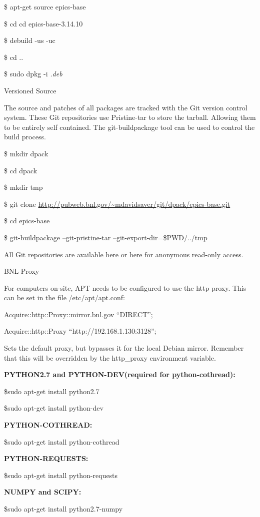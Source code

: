 \documentclass[letterpaper,10pt,english]{sphinxmanual}
\begin{document}
\$ apt-get source epics-base

\$ cd cd epics-base-3.14.10

\$ debuild -us -uc

\$ cd ..

\$ sudo dpkg -i \emph{.deb}

Versioned Source

The source and patches of all packages are tracked with the Git version control system. These Git repositories use Pristine-tar to store the tarball. Allowing them to be entirely self contained. The git-buildpackage tool can be used to control the build process.

\$ mkdir dpack

\$ cd dpack

\$ mkdir tmp

\$ git clone \href{http://pubweb.bnl.gov/~mdavidsaver/git/dpack/epics-base.git}{http://pubweb.bnl.gov/\textasciitilde{}mdavidsaver/git/dpack/epics-base.git}

\$ cd epics-base

\$ git-buildpackage --git-pristine-tar --git-export-dir=\$PWD/../tmp

All Git repositories are available here or here for anonymous read-only access.

BNL Proxy

For computers on-site, APT needs to be configured to use the http proxy. This can be set in the file /etc/apt/apt.conf:

Acquire::http::Proxy::mirror.bnl.gov ``DIRECT'';

Acquire::http::Proxy  ``http://192.168.1.130:3128'';

Sets the default proxy, but bypasses it for the local Debian mirror. Remember that this will be overridden by the http\_proxy environment variable.

\textbf{PYTHON2.7 and PYTHON-DEV(required for python-cothread):}

\$sudo apt-get install python2.7

\$sudo apt-get install python-dev

\textbf{PYTHON-COTHREAD:}

\$sudo apt-get install python-cothread

\textbf{PYTHON-REQUESTS:}

\$sudo apt-get install python-requests

\textbf{NUMPY and SCIPY:}

\$sudo apt-get install python2.7-numpy
\end{document}
